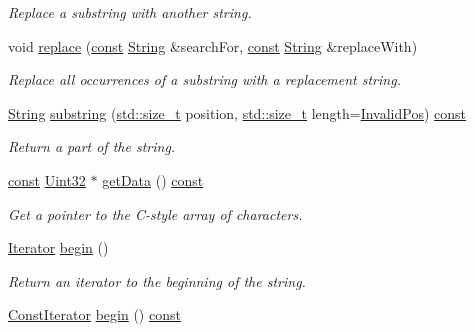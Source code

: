 \begin{DoxyCompactItemize}
\begin{DoxyCompactList}\small\item\em Replace a substring with another string. \end{DoxyCompactList}\item 
void \hyperlink{classsf_1_1_string_a82bbfee2bf23c641e5361ad505c07921}{replace} (\hyperlink{term__entry_8h_a57bd63ce7f9a353488880e3de6692d5a}{const} \hyperlink{classsf_1_1_string}{String} \&search\-For, \hyperlink{term__entry_8h_a57bd63ce7f9a353488880e3de6692d5a}{const} \hyperlink{classsf_1_1_string}{String} \&replace\-With)
\begin{DoxyCompactList}\small\item\em Replace all occurrences of a substring with a replacement string. \end{DoxyCompactList}\item 
\hyperlink{classsf_1_1_string}{String} \hyperlink{classsf_1_1_string_a5ee1913acbad01c24feec87d294f6529}{substring} (\hyperlink{nc__alloc_8h_a7b60c5629e55e8ec87a4547dd4abced4}{std\-::size\-\_\-t} position, \hyperlink{nc__alloc_8h_a7b60c5629e55e8ec87a4547dd4abced4}{std\-::size\-\_\-t} length=\hyperlink{classsf_1_1_string_a7dd58138a3f2bd887e5711879fd83570}{Invalid\-Pos}) \hyperlink{term__entry_8h_a57bd63ce7f9a353488880e3de6692d5a}{const} 
\begin{DoxyCompactList}\small\item\em Return a part of the string. \end{DoxyCompactList}\item 
\hyperlink{term__entry_8h_a57bd63ce7f9a353488880e3de6692d5a}{const} \hyperlink{namespacesf_aa746fb1ddef4410bddf198ebb27e727c}{Uint32} $\ast$ \hyperlink{classsf_1_1_string_af2d4e70869ebd38e225c6796e1325ae4}{get\-Data} () \hyperlink{term__entry_8h_a57bd63ce7f9a353488880e3de6692d5a}{const} 
\begin{DoxyCompactList}\small\item\em Get a pointer to the C-\/style array of characters. \end{DoxyCompactList}\item 
\hyperlink{classsf_1_1_string_ac90f2b7b28f703020f8d027e98806235}{Iterator} \hyperlink{classsf_1_1_string_a8ec30ddc08e3a6bd11c99aed782f6dfe}{begin} ()
\begin{DoxyCompactList}\small\item\em Return an iterator to the beginning of the string. \end{DoxyCompactList}\item 
\hyperlink{classsf_1_1_string_a8e18efc2e8464f6eb82818902d527efa}{Const\-Iterator} \hyperlink{classsf_1_1_string_a09bbf7704847ed35bf1c18aca6fba2a2}{begin} () \hyperlink{term__entry_8h_a57bd63ce7f9a353488880e3de6692d5a}{const} 

\end{DoxyCompactItemize}
